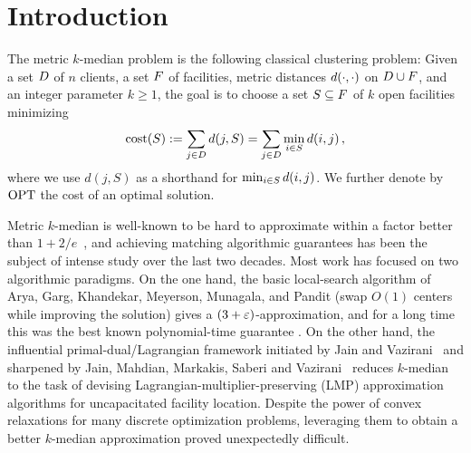 \section{Introduction}
\label{sec:introduction}

The metric $k$-median problem is the following classical clustering problem: Given a set $D$ of $n$ clients, a set $F$ of facilities, metric distances $d(\cdot, \cdot)$ on $D \cup F$, and an integer parameter $k\ge 1$, the goal is to choose a set $S\subseteq F$ of $k$ open facilities minimizing
\[
    \text{cost}(S):=\sum_{j\in D} d(j,S)= \sum_{j\in D} \min_{i\in S} d(i,j)\,,
\]
where we use $d(j,S)$ as a shorthand for $\min_{i\in S} d(i,j)$. We further denote by $\textnormal{OPT}$ the cost of an optimal solution. 

Metric $k$-median is well-known to be hard to approximate within a factor better than $1+2/e$~\cite{GuK99,JMS02,JainMMSV03}, and achieving matching algorithmic guarantees has been the subject of intense study over the last two decades. Most work has focused on two algorithmic paradigms. On the one hand, the basic local-search algorithm of Arya, Garg, Khandekar, Meyerson, Munagala, and Pandit (swap $O(1)$ centers while improving the solution) gives a $(3+\varepsilon)$-approximation, and for a long time this was the best known polynomial-time guarantee \cite{AryaGKMMP04}. On the other hand, the influential primal-dual/Lagrangian framework initiated by Jain and Vazirani~\cite{JaV01} and sharpened by Jain, Mahdian, Markakis, Saberi and Vazirani~\cite{JMS02,JainMMSV03} reduces $k$-median to the task of devising Lagrangian-multiplier-preserving (LMP) approximation algorithms for uncapacitated facility location. Despite the power of convex relaxations for many discrete optimization problems, leveraging them to obtain a better $k$-median approximation proved unexpectedly difficult.

